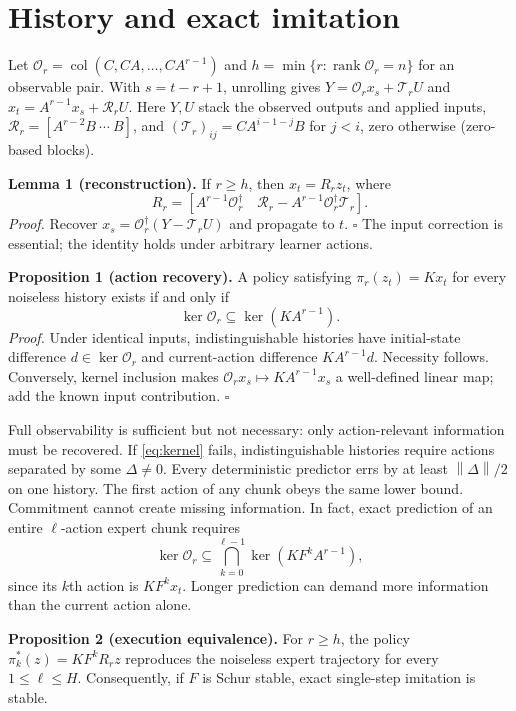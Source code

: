 \documentclass[11pt]{article}
\newcommand{\norm}[1]{\left\lVert#1\right\rVert}
\begin{document}
\section{History and exact imitation}
Let $\mathcal O_r=\operatorname{col}(C,CA,\ldots,CA^{r-1})$ and $h=\min\{r:\operatorname{rank}\mathcal O_r=n\}$ for an observable pair. With $s=t-r+1$, unrolling gives $Y=\mathcal O_rx_s+\mathcal T_rU$ and $x_t=A^{r-1}x_s+\mathcal R_rU$. Here $Y,U$ stack the observed outputs and applied inputs, $\mathcal R_r=[A^{r-2}B\ \cdots\ B]$, and $(\mathcal T_r)_{ij}=CA^{i-1-j}B$ for $j<i$, zero otherwise (zero-based blocks).

\textbf{Lemma 1 (reconstruction).} If $r\ge h$, then $x_t=R_rz_t$, where
\begin{equation}
R_r=[A^{r-1}\mathcal O_r^\dagger\quad\mathcal R_r-A^{r-1}\mathcal O_r^\dagger\mathcal T_r].
\label{eq:reconstruction}
\end{equation}
\emph{Proof.} Recover $x_s=\mathcal O_r^\dagger(Y-\mathcal T_rU)$ and propagate to $t$. $\square$ The input correction is essential; the identity holds under arbitrary learner actions.

\textbf{Proposition 1 (action recovery).} A policy satisfying $\pi_r(z_t)=Kx_t$ for every noiseless history exists if and only if
\begin{equation}\ker\mathcal O_r\subseteq\ker(KA^{r-1}).\label{eq:kernel}\end{equation}
\emph{Proof.} Under identical inputs, indistinguishable histories have initial-state difference $d\in\ker\mathcal O_r$ and current-action difference $KA^{r-1}d$. Necessity follows. Conversely, kernel inclusion makes $\mathcal O_rx_s\mapsto KA^{r-1}x_s$ a well-defined linear map; add the known input contribution. $\square$

Full observability is sufficient but not necessary: only action-relevant information must be recovered. If \eqref{eq:kernel} fails, indistinguishable histories require actions separated by some $\Delta\ne0$. Every deterministic predictor errs by at least $\norm{\Delta}/2$ on one history. The first action of any chunk obeys the same lower bound. Commitment cannot create missing information. In fact, exact prediction of an entire $\ell$-action expert chunk requires
\[
\ker\mathcal O_r\subseteq\bigcap_{k=0}^{\ell-1}\ker(KF^kA^{r-1}),
\]
since its $k$th action is $KF^kx_t$. Longer prediction can demand more information than the current action alone.

\textbf{Proposition 2 (execution equivalence).} For $r\ge h$, the policy $\pi_k^*(z)=KF^kR_rz$ reproduces the noiseless expert trajectory for every $1\le\ell\le H$. Consequently, if $F$ is Schur stable, exact single-step imitation is stable.
\end{document}
